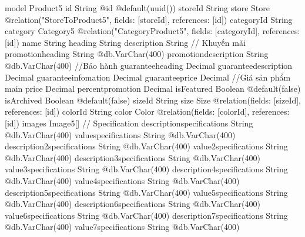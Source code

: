 model Product5 {
  id                           String                         @id @default(uuid())
  storeId                      String
  store                        Store                          @relation("StoreToProduct5", fields: [storeId], references: [id])
  categoryId                   String
  category                     Category5                      @relation("CategoryProduct5", fields: [categoryId], references: [id])
  name                         String
  heading                      String
  description                  String
  // Khuyến mãi
  promotionheading             String                         @db.VarChar(400)
  promotiondescription         String                         @db.VarChar(400)
  //Bảo hành
  guaranteeheading             Decimal
  guaranteedescription         Decimal
  guaranteeinfomation          Decimal
  guaranteeprice               Decimal
  //Giá sản phẩm main
  price                        Decimal
  percentpromotion             Decimal
  isFeatured                   Boolean                        @default(false)
  isArchived                   Boolean                        @default(false)
  sizeId                       String
  size                         Size                           @relation(fields: [sizeId], references: [id])
  colorId                      String
  color                        Color                          @relation(fields: [colorId], references: [id])
  images                       Image5[]
  // Specification
  descriptionspecifications    String                         @db.VarChar(400)
  valuespecifications          String                         @db.VarChar(400)
  description2specifications   String                         @db.VarChar(400)
  value2specifications         String                         @db.VarChar(400)
  description3specifications   String                         @db.VarChar(400)
  value3specifications         String                         @db.VarChar(400)
  description4specifications   String                         @db.VarChar(400)
  value4specifications         String                         @db.VarChar(400)
  description5specifications   String                         @db.VarChar(400)
  value5specifications         String                         @db.VarChar(400)
  description6specifications   String                         @db.VarChar(400)
  value6specifications         String                         @db.VarChar(400)
  description7specifications   String                         @db.VarChar(400)
  value7specifications         String                         @db.VarChar(400)
}
